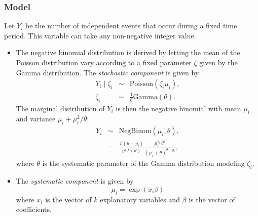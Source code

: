\documentclass{article}
\begin{document}
\subsubsection{Model}
Let $Y_i$ be the number of independent events that occur during a
fixed time period. This variable can take any non-negative integer value.

\begin{itemize}
\item The negative binomial distribution is derived by letting the
  mean of the Poisson distribution vary according to a fixed
  parameter $\zeta$ given by the Gamma distribution. The
  \emph{stochastic component} is given by
   \begin{eqnarray*}
     Y_i \mid \zeta_i & \sim & \textrm{Poisson}(\zeta_i \mu_i),\\
     \zeta_i & \sim & \frac{1}{\theta}\textrm{Gamma}(\theta).
   \end{eqnarray*}
   The marginal distribution of $Y_i$ is then the negative binomial
   with mean $\mu_i$ and variance $\mu_i + \mu_i^2/\theta$:
   \begin{eqnarray*}
   Y_i & \sim & \textrm{NegBinom}(\mu_i, \theta), \\
       & = & \frac{\Gamma (\theta + y_i)}{y! \, \Gamma(\theta)} 
             \frac{\mu_i^{y_i} \, \theta^{\theta}}{(\mu_i + \theta)^{\theta + y_i}},
   \end{eqnarray*}
   where $\theta$ is the systematic parameter of the Gamma
   distribution modeling $\zeta_i$.  

 \item The \emph{systematic component} is given by
   \begin{equation*}
     \mu_i = \exp(x_i \beta)
   \end{equation*}
   where $x_i$ is the vector of $k$ explanatory variables and $\beta$ is
   the vector of coefficients.
 \end{itemize}
\end{document}
